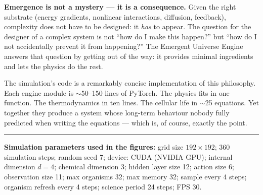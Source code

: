\documentclass[12pt,a4paper]{article}
\begin{document}
\begin{tcolorbox}[keybox={The central lesson}]
\textbf{Emergence is not a mystery — it is a consequence.}
Given the right substrate (energy gradients, nonlinear interactions,
diffusion, feedback), complexity does not have to be designed:
it \emph{has} to appear.
The question for the designer of a complex system is not
``how do I make this happen?'' but
``how do I not accidentally prevent it from happening?''
The Emergent Universe Engine answers that question by
getting out of the way: it provides minimal ingredients
and lets the physics do the rest.
\end{tcolorbox}

The simulation's code is a remarkably concise implementation
of this philosophy.
Each engine module is $\sim$50--150 lines of PyTorch.
The physics fits in one function.
The thermodynamics in ten lines.
The cellular life in $\sim$25 equations.
Yet together they produce a system whose long-term behaviour
nobody fully predicted when writing the equations —
which is, of course, exactly the point.

\bigskip
\hrule
\bigskip
{\small
\noindent\textbf{Simulation parameters used in the figures:}
grid size $192\times192$; 360 simulation steps; random seed 7;
device: CUDA (NVIDIA GPU); internal dimension $d=4$;
chemical dimension 3; hidden layer size 12; action size 6;
observation size 11; max organisms 32; max memory 32;
sample every 4 steps; organism refresh every 4 steps;
science period 24 steps; FPS 30.
}
\end{document}
